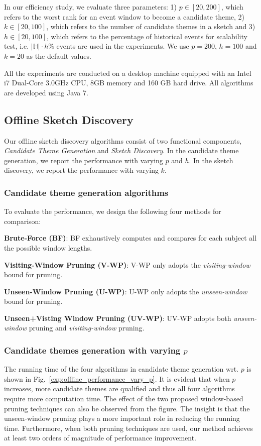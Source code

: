 In our efficiency study, we evaluate three parameters: 1) $p\in[20,200]$, which refers to the worst rank for an event window to become a candidate theme, 2) $k\in[20,100]$, which refers to the number of candidate themes in a sketch and 3) $h\in[20,100]$, which refers to the percentage of historical events for scalability test, i.e. $|\mathbb{H}|\cdot h\%$ events are used in the experiments. We use $p=200$, $h=100$ and $k=20$ as the default values.

All the experiments are conducted on a desktop machine equipped with an Intel i7 Dual-Core 3.0GHz CPU, 8GB memory and 160 GB hard drive. All algorithms are developed using Java 7. 
 
\subsection{Offline Sketch Discovery}
\label{subsec:exp-offline}
Our offline sketch discovery algorithms consist of two functional components, \emph{Candidate Theme Generation}
and \emph{Sketch Discovery}. In the candidate theme generation, we report the performance with varying $p$ and $h$. In the sketch discovery, we report the performance with varying $k$.

\subsubsection{Candidate theme generation algorithms}
To evaluate the performance, we design the following four methods for comparison:

\noindent\textbf{Brute-Force (BF)}: BF exhaustively computes and compares for each subject all the possible window lengths. 

\noindent\textbf{Visiting-Window Pruning (V-WP)}: V-WP only adopts the \emph{visiting-window} bound for pruning.

\noindent\textbf{Unseen-Window Pruning (U-WP)}: U-WP only adopts the \emph{unseen-window} bound for pruning. 

\noindent\textbf{Unseen+Visting Window Pruning (UV-WP)}: UV-WP adopts both \emph{unseen-window} pruning and \emph{visiting-window} pruning.

\subsubsection{Candidate themes generation with varying $p$}
The running time of the four algorithms in candidate theme generation wrt. $p$ is shown in Fig.~\ref{exp:offline_performance_vary_p}. It is evident that when $p$ increases, more candidate themes are qualified and thus all four algorithms require more computation time. The effect of the two proposed window-based pruning techniques can also be observed from the figure. The insight is that the unseen-window pruning plays a more important role in reducing the running time. Furthermore, when both pruning techniques are used, our method achieves at least two orders of magnitude of performance improvement.

